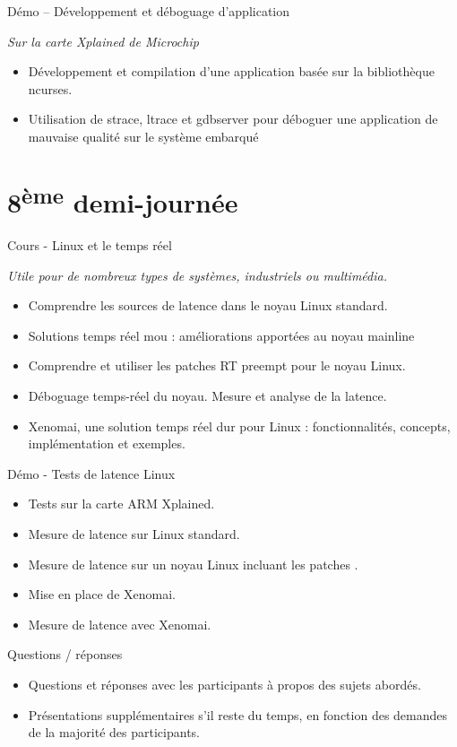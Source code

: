 \documentclass[a4paper,12pt,obeyspaces,spaces,hyphens]{article}
\begin{document}
\feagendaonecolumn
{Démo – Développement et déboguage d'application}
{
  {\em Sur la carte Xplained de Microchip}
  \begin{itemize}
  \item Développement et compilation d'une application basée sur la bibliothèque
	ncurses.
  \item Utilisation de strace, ltrace et gdbserver pour déboguer une application de
	mauvaise qualité sur le système embarqué
  \end{itemize}
}

\section{8\textsuperscript{ème} demi-journée}

\feagendaonecolumn
{Cours - Linux et le temps réel}
{
  {\em Utile pour de nombreux types de systèmes, industriels ou multimédia.}
  \begin{itemize}
  \item Comprendre les sources de latence dans le noyau Linux standard.
  \item Solutions temps réel mou : améliorations apportées au noyau mainline
  \item Comprendre et utiliser les patches RT preempt pour le noyau Linux.
  \item Déboguage temps-réel du noyau. Mesure et analyse de la latence.
  \item Xenomai, une solution temps réel dur pour Linux : fonctionnalités, concepts,
	implémentation et exemples.
  \end{itemize}
}

\feagendaonecolumn
{Démo - Tests de latence Linux}
{
  \begin{itemize}
  \item Tests sur la carte ARM Xplained.
  \item Mesure de latence sur Linux standard.
  \item Mesure de latence sur un noyau Linux
	incluant les patches .
  \item Mise en place de Xenomai.
  \item Mesure de latence avec Xenomai.
  \end{itemize}
}

\feagendaonecolumn
{Questions / réponses}
{
  \begin{itemize}
  \item Questions et réponses avec les participants à propos des sujets abordés.
  \item Présentations supplémentaires s'il reste du temps, en fonction des demandes
        de la majorité des participants.
  \end{itemize}
}
\end{document}
